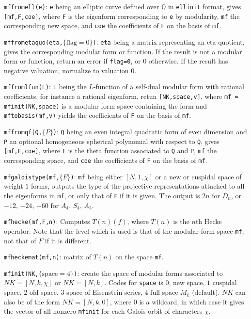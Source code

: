\documentclass[11pt]{article}
\newcommand{\Q}{{\mathbb Q}}
\def\kbd#1{{\tt #1}}
\begin{document}
\f\kbd{mffromell(e)}: \kbd{e} being an elliptic curve defined over $\Q$ in
\kbd{ellinit} format, gives \kbd{[mf,F,coe]}, where \kbd{F} is the eigenform
corresponding to \kbd{e} by modularity, \kbd{mf} the corresponding new space,
and \kbd{coe} the coefficients of \kbd{F} on the basis of \kbd{mf}.

\f\kbd{mffrometaquo(eta,$\{\text{flag}=0\}$)}: \kbd{eta} being a matrix
representing an eta quotient, gives the corresponding modular form or
function. If the result is not a modular form or function, return an error if
\kbd{flag=0}, or $0$ otherwise. If the result has negative valuation,
normalize to valuation $0$.

\f\kbd{mffromlfun(L)}: \kbd{L} being the $L$-function of a self-dual modular
form with rational coefficients, for instance a rational eigenform, retun
\kbd{[NK,space,v]}, where \kbd{mf = mfinit(NK,space)} is a modular form space
containing the form and \kbd{mftobasis(mf,v)} yields the coefficients of
\kbd{F} on the basis of \kbd{mf}.

\f\kbd{mffromqf(Q,$\{P\}$)}: \kbd{Q} being an even integral quadratic form of
even dimension and \kbd{P} an optional homogeneous spherical polynomial with
respect to \kbd{Q}, gives \kbd{[mf,F,coe]}, where \kbd{F} is the theta
function associated to \kbd{Q} and \kbd{P}, \kbd{mf} the corresponding space,
and \kbd{coe} the coefficients of \kbd{F} on the basis of \kbd{mf}.

\f\kbd{mfgaloistype(mf,$\{F\}$)}: \kbd{mf} being either $[N,1,\chi]$ or
a new or cuspidal space of weight $1$ forms, outputs the type of the projective
representations attached to all the eigenforms in \kbd{mf}, or only that of
\kbd{F} if it is given. The output is $2n$ for $D_n$, or $-12$, $-24$, $-60$
for $A_4$, $S_4$, $A_5$.

\f\kbd{mfhecke(mf,F,n)}: Computes $T(n)(f)$, where $T(n)$ is the $n$th Hecke
operator. Note that the level which is used is that of the modular form space
\kbd{mf}, not that of $F$ if it is different.

\f\kbd{mfheckemat(mf,n)}: matrix of $T(n)$ on the space \kbd{mf}.

\f\kbd{mfinit(NK,$\{\text{space}=4\}$)}: create the space of modular forms
associated to $NK=[N,k,\chi]$ or $NK=[N,k]$. Codes for \kbd{space} is $0$,
new space, $1$ cuspidal space, $2$ old space, $3$ space of Eisenstein series,
$4$ full space $M_k$ (default). $NK$ can also be of the form $NK=[N,k,0]$,
where $0$ is a wildcard, in which case it gives the vector of all nonzero
\kbd{mfinit} for each Galois orbit of characters $\chi$.
\end{document}
